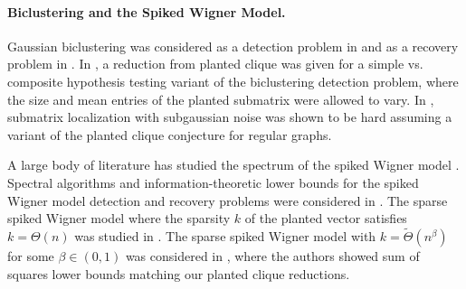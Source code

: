 \paragraph{Biclustering and the Spiked Wigner Model.} Gaussian biclustering was considered as a detection problem in \cite{butucea2013detection, ma2015computational, montanari2015limitation} and as a recovery problem in \cite{shabalin2009finding, kolar2011minimax, balakrishnan2011statistical, cai2015computational, chen2016statistical, hajek2016information}. In \cite{ma2015computational}, a reduction from planted clique was given for a simple vs. composite hypothesis testing variant of the biclustering detection problem, where the size and mean entries of the planted submatrix were allowed to vary. In \cite{cai2015computational}, submatrix localization with subgaussian noise was shown to be hard assuming a variant of the planted clique conjecture for regular graphs.

A large body of literature has studied the spectrum of the spiked Wigner model \cite{peche2006largest, feral2007largest, capitaine2009largest, benaych2011eigenvalues}. Spectral algorithms and information-theoretic lower bounds for the spiked Wigner model detection and recovery problems were considered in \cite{montanari2015limitation, perry2016statistical, perry2016optimality}. The sparse spiked Wigner model where the sparsity $k$ of the planted vector satisfies $k = \Theta(n)$ was studied in \cite{perry2016statistical, perry2016optimality, banks2018information}. The sparse spiked Wigner model with $k = \tilde{\Theta}(n^{\beta})$ for some $\beta \in (0, 1)$ was considered in \cite{hopkins2017power}, where the authors showed sum of squares lower bounds matching our planted clique reductions.

